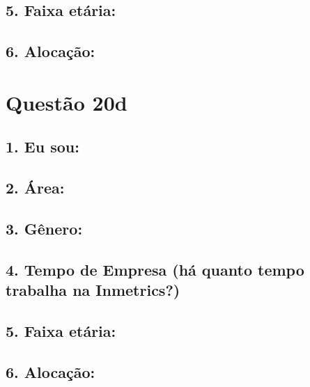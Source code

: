 \documentclass[]{book}
\begin{document}
\hypertarget{faixa-etaria-55}{%
\subsection{5. Faixa etária:}\label{faixa-etaria-55}}

\hypertarget{alocacao-55}{%
\subsection{6. Alocação:}\label{alocacao-55}}

\hypertarget{questao-20d}{%
\section{Questão 20d}\label{questao-20d}}

\hypertarget{eu-sou-56}{%
\subsection{1. Eu sou:}\label{eu-sou-56}}

\hypertarget{area-56}{%
\subsection{2. Área:}\label{area-56}}

\hypertarget{genero-56}{%
\subsection{3. Gênero:}\label{genero-56}}

\hypertarget{tempo-de-empresa-ha-quanto-tempo-trabalha-na-inmetrics-56}{%
\subsection{4. Tempo de Empresa (há quanto tempo trabalha na Inmetrics?)}\label{tempo-de-empresa-ha-quanto-tempo-trabalha-na-inmetrics-56}}

\hypertarget{faixa-etaria-56}{%
\subsection{5. Faixa etária:}\label{faixa-etaria-56}}

\hypertarget{alocacao-56}{%
\subsection{6. Alocação:}\label{alocacao-56}}
\end{document}
